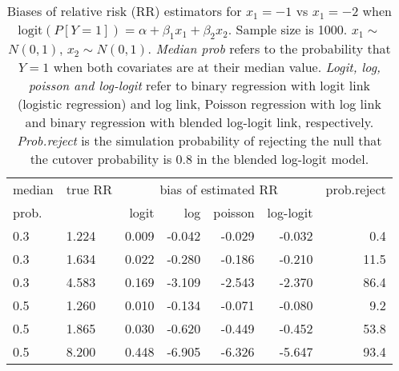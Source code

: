 \documentclass[12pt,a4paper]{article}
\begin{document}
\begin{table}[H] 
\small\sf\centering 
\caption{Biases of relative risk (RR) estimators for $x_1=-1$ vs $x_1=-2$ when $\mbox{logit}(P[Y=1])=\alpha+\beta_1 x_1 + \beta_2 x_2$. Sample size is 1000. $x_1 \sim $$N(0,1)$, $x_2 \sim N(0,1)$. {\it Median prob} refers to the probability that $Y=1$ when both covariates are at their median value. {\it Logit, log, poisson and log-logit} refer to binary regression with logit link (logistic regression) and log link, Poisson regression with log link and binary regression with blended log-logit link, respectively. {\it Prob.reject} is the simulation probability of rejecting the null that the cutover probability is $0.8$ in the blended log-logit model.} 
\begin{tabular}{llrrrrr} 
\toprule 
median & true RR & \multicolumn{4}{c}{bias of estimated RR} & prob.reject \\ 
prob. & & logit & log & poisson & log-logit  & \\ \midrule 
0.3 & 1.224 & 0.009 & -0.042 & -0.029 & -0.032 &  0.4 \\  
0.3 & 1.634 & 0.022 & -0.280 & -0.186 & -0.210 & 11.5 \\  
0.3 & 4.583 & 0.169 & -3.109 & -2.543 & -2.370 & 86.4 \\  
0.5 & 1.260 & 0.010 & -0.134 & -0.071 & -0.080 &  9.2 \\  
0.5 & 1.865 & 0.030 & -0.620 & -0.449 & -0.452 & 53.8 \\  
0.5 & 8.200 & 0.448 & -6.905 & -6.326 & -5.647 & 93.4 \\  
\bottomrule 
\end{tabular} 
\end{table} 
\end{document}

